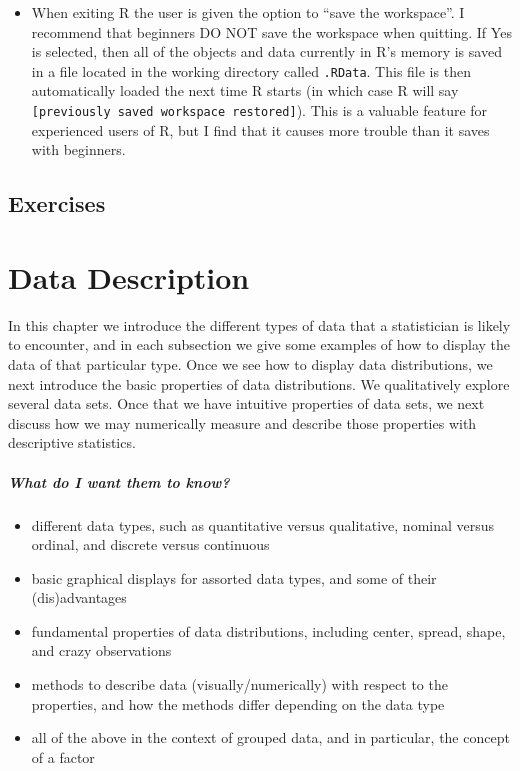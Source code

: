 \documentclass[captions=tableheading]{scrbook}
\begin{document}
\begin{itemize}
\item When exiting \textsf{R} the user is given the option to ``save the workspace''. I recommend that beginners DO NOT save the workspace when quitting. If \textsf{Yes} is selected, then all of the objects and data currently in \textsf{R}'s memory is saved in a file located in the working directory called \texttt{.RData}. This file is then automatically loaded the next time \textsf{R} starts (in which case \textsf{R} will say \texttt{[previously saved workspace restored]}). This is a valuable feature for experienced users of \textsf{R}, but I find that it causes more trouble than it saves with beginners.
\end{itemize}

\newpage{}
\section{Exercises}
\label{sec-2-7}

\setcounter{thm}{0}
\chapter{Data Description}
\label{sec-3}

\label{cha:Describing-Data-Distributions}

\noindent In this chapter we introduce the different types of data that a statistician is likely to encounter, and in each subsection we give some examples of how to display the data of that particular type. Once we see how to display data distributions, we next introduce the basic properties of data distributions. We qualitatively explore several data sets. Once that we have intuitive properties of data sets, we next discuss how we may numerically measure and describe those properties with descriptive statistics.

\paragraph*{What do I want them to know?}

\begin{itemize}
\item different data types, such as quantitative versus qualitative, nominal versus ordinal, and discrete versus continuous
\item basic graphical displays for assorted data types, and some of their (dis)advantages
\item fundamental properties of data distributions, including center, spread, shape, and crazy observations
\item methods to describe data (visually/numerically) with respect to the properties, and how the methods differ depending on the data type
\item all of the above in the context of grouped data, and in particular, the concept of a factor
\end{itemize}
\end{document}
